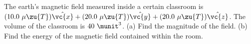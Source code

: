 The earth's magnetic field measured inside a certain classroom
is $(10.0\ \mu\zu{T})\hat{\vc{x}}+(20.0\ \mu\zu{T})\hat{\vc{y}}+(20.0\ \mu\zu{T})\hat{\vc{z}}$.
The volume of the classroom is $40\ \munit^3$.
(a) Find the magnitude of the field.\answercheck\hwendpart
(b) Find the energy of the magnetic field contained within the room.
\answercheck\hwendpart


